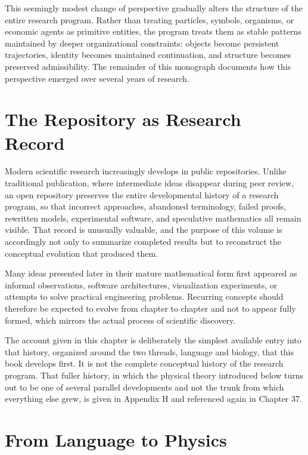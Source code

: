\documentclass[11pt,oneside]{book}
\numberwithin{equation}{chapter}
\theoremstyle{definition}
\theoremstyle{plain}
\begin{document}
This seemingly modest change of perspective gradually alters the structure of the entire research program. Rather than treating particles, symbols, organisms, or economic agents as primitive entities, the program treats them as stable patterns maintained by deeper organizational constraints: objects become persistent trajectories, identity becomes maintained continuation, and structure becomes preserved admissibility. The remainder of this monograph documents how this perspective emerged over several years of research.

\section{The Repository as Research Record}

Modern scientific research increasingly develops in public repositories. Unlike traditional publication, where intermediate ideas disappear during peer review, an open repository preserves the entire developmental history of a research program, so that incorrect approaches, abandoned terminology, failed proofs, rewritten models, experimental software, and speculative mathematics all remain visible. That record is unusually valuable, and the purpose of this volume is accordingly not only to summarize completed results but to reconstruct the conceptual evolution that produced them.

Many ideas presented later in their mature mathematical form first appeared as informal observations, software architectures, visualization experiments, or attempts to solve practical engineering problems. Recurring concepts should therefore be expected to evolve from chapter to chapter and not to appear fully formed, which mirrors the actual process of scientific discovery.

The account given in this chapter is deliberately the simplest available entry into that history, organized around the two threads, language and biology, that this book develops first. It is not the complete conceptual history of the research program. That fuller history, in which the physical theory introduced below turns out to be one of several parallel developments and not the trunk from which everything else grew, is given in Appendix H and referenced again in Chapter 37.

\section{From Language to Physics}
\end{document}
